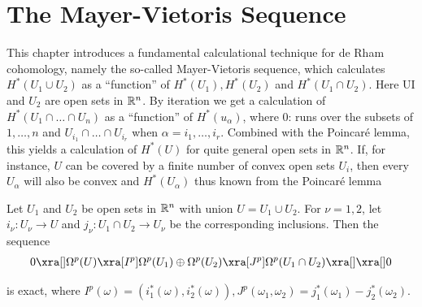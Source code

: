 \chapter{The Mayer-Vietoris Sequence}
This chapter introduces a fundamental calculational technique for de Rham
cohomology, namely the so-called Mayer-Vietoris sequence, which calculates
$H^*(U_1\cup U_2)$ as a ``function'' of $H^*(U_1), H^*(U_2)$ and $H^*(U_1\cap U_2)$. Here UI and
$U_2$ are open sets in ${\mathbb{R}}^n$. By iteration we get a calculation of $H^*(U_1\cap\ldots\cap U_n)$ as
a ``function'' of $H^*(u_\alpha)$, where 0: runs over the subsets of ${1,\ldots, n}$ and 
$U_{i_1}\cap\ldots\cap U_{i_r}$ when $\alpha = {i_1,\ldots, i_r }$. Combined with the Poincar\'e lemma, this
yields a  calculation of $H^*(U)$ for quite general open sets in ${\mathbb{R}}^n$. If, for
instance, $U$ can be covered by a finite number of convex open sets $U_i$, then every
$U_\alpha$ will also be convex and $H^*(U_\alpha)$ thus known from the Poincar\'e lemma


\begin{theorem}\label{theorem:5-1}
Let $U_1$ and $U_2$ be open sets in ${\mathbb{R}}^n$ with union $U = U_1\cup U_2$. For $\nu = 1, 2$, let 
$i_\nu: U_\nu\to U$ and $j_\nu:U_1\cap U_2\to U_\nu$ be the corresponding inclusions. Then the sequence
\begin{align*}
  0\xra[]\Omega^p(U)\xra[I^p]\Omega^p(U_1)\oplus\Omega^p(U_2)\xra[J^p]\Omega^p(U_1\cap U_2)\xra[]\xra[]0
\end{align*}

is exact, where $I^p(\omega) = (i^*_1(\omega), i^*_2(\omega)), J^p(\omega_1, \omega_2) = j^*_1(\omega_1) - j^*_2(\omega_2)$.
\end{theorem}

